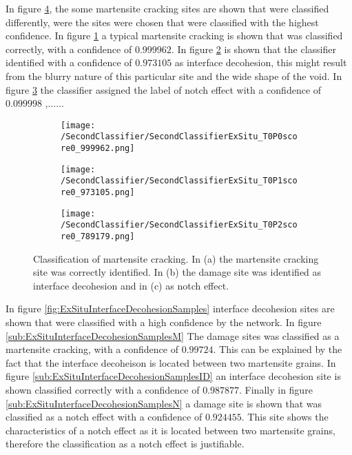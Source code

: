In figure \ref{fig:ExSituMartensiteSamples}, the some martensite cracking sites are shown that were classified differently, were the sites were chosen that were classified with the highest confidence. In figure \ref{sub:ExSituMartensiteSamplesM} a typical martensite cracking is shown that was classified correctly, with a confidence of $0.999962$. In figure \ref{sub:ExSituMartensiteSamplesI} is shown that the classifier identified with a confidence of $0.973105$ as interface decohesion, this might result from the blurry nature of this particular site and the wide shape of the void. In figure \ref{sub:ExSituMartensiteSamplesN} the classifier assigned the label of notch effect with a confidence of $0.099998$ ,...... 

\begin{figure}[H]
\centering
\begin{subfigure}{0.3\textwidth}
\texttt{[image: /SecondClassifier/SecondClassifierExSitu\_T0P0score0\_999962.png]}
\caption{}
\label{sub:ExSituMartensiteSamplesM}
\end{subfigure}
\begin{subfigure}{0.3\textwidth}
\texttt{[image: /SecondClassifier/SecondClassifierExSitu\_T0P1score0\_973105.png]}
\caption{}
\label{sub:ExSituMartensiteSamplesI}
\end{subfigure}
\begin{subfigure}{0.3\textwidth}
\texttt{[image: /SecondClassifier/SecondClassifierExSitu\_T0P2score0\_789179.png]}
\caption{}
\label{sub:ExSituMartensiteSamplesN}
\end{subfigure}
\caption{Classification of martensite cracking. In (a) the martensite cracking site was correctly identified. In (b) the damage site was identified as interface decohesion and in (c) as notch effect. }
\label{fig:ExSituMartensiteSamples}
\end{figure}

In figure \ref{fig:ExSituInterfaceDecohesionSamples} interface decohesion sites are shown that were classified with a high confidence by the network. In figure \ref{sub:ExSituInterfaceDecohesionSamplesM} The damage sites was classified as a martensite cracking, with a confidence of $0.99724$. This can be explained by the fact that the interface decoheison is located between two martensite grains. In figure \ref{sub:ExSituInterfaceDecohesionSamplesID} an interface decohesion site is shown classified correctly with a confidence of $0.987877$. Finally in figure \ref{sub:ExSituInterfaceDecohesionSamplesN} a damage site is shown that was classified as a notch effect with a confidence of $0.924455$. This site shows the characteristics of a notch effect as it is located between two martensite grains, therefore the classification as a notch effect is justifiable. 

